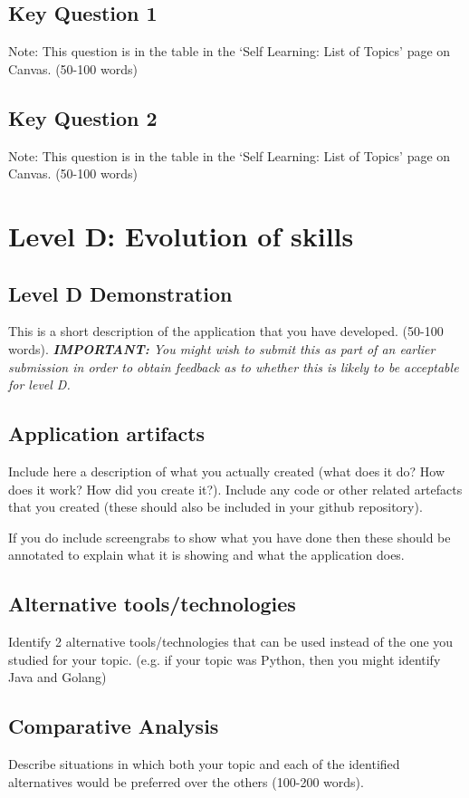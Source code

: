 \documentclass[a4paper, 11pt]{report}
\begin{document}
\subsection{Key Question 1}
Note: This question is in the table in the ‘Self Learning: List of Topics’ page on Canvas. (50-100 words)

\subsection{Key Question 2}
Note: This question is in the table in the ‘Self Learning: List of Topics’ page on Canvas. (50-100 words)



\newpage
\section{Level D: Evolution of skills}
\vspace{5mm}
\subsection{Level D Demonstration}

This is a short description of the application that you have developed. (50-100 words).
\textit{{\bf IMPORTANT:} You might wish to submit this as part of an earlier submission in order to obtain feedback as to whether this is likely to be acceptable for level D.}

\subsection{Application artifacts}

Include here a description of what you actually created (what does it do? How does it work? How did you create it?). Include any code or other related artefacts that you created (these should also be included in your github repository).

If you do include screengrabs to show what you have done then these should be annotated to explain what it is showing and what the application does.

\subsection{Alternative tools/technologies}
Identify 2 alternative tools/technologies that can be used instead of the one you studied for your topic. (e.g. if your topic was Python, then you might identify Java and Golang)
\subsection{Comparative Analysis}
Describe situations in which both your topic and each of the identified alternatives would be preferred over the others (100-200 words).




\newpage



\printbibliography
\end{document}
